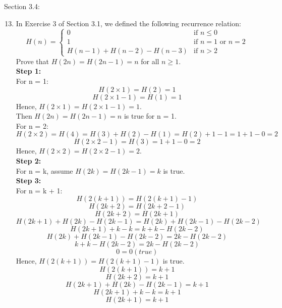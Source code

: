\documentclass[12pt]{article}
\begin{document}
Section 3.4:

\begin{enumerate}
\setcounter{enumi}{12}
    \item In Exercise 3 of Section 3.1, we defined the following recurrence relation:
    \[
    H(n) = 
    \begin{cases} 
    0 & \text{if } n \leq 0 \\
    1 & \text{if } n = 1 \text{ or } n = 2 \\
    H(n-1) + H(n-2) - H(n-3) & \text{if } n > 2
    \end{cases}
    \]
    Prove that $H(2n) = H(2n - 1) = n$ for all $n \geq 1$.\\
    \textbf{Step 1:}\\
    For n = 1:
    \[H(2 \times 1) = H(2) = 1\]
    \[H(2 \times 1 - 1) = H(1) = 1\]
    Hence, $H(2 \times 1) = H(2 \times 1 - 1) = 1$. \\
    Then $H(2n) = H(2n - 1) = n$ is true for n = 1.\\
    For n = 2:
    \[H(2 \times 2) = H(4) = H(3) + H(2) - H(1) = H(2) + 1 - 1 = 1 + 1 - 0 = 2\]
    \[H(2 \times 2 - 1) = H(3) = 1 + 1 - 0 = 2\]
    Hence, $H(2 \times 2) = H(2 \times 2 - 1) = 2$. \\
    \textbf{Step 2:}\\
    For n = k, assume $H(2k) = H(2k - 1) = k$ is true.\\
    \textbf{Step 3:}\\
    For n = k + 1:
    \[H(2(k + 1)) = H(2(k+1) - 1)\]
    \[H(2k + 2) = H(2k+2 - 1)\]
    \[H(2k + 2) = H(2k+1)\]
    \[H(2k + 1) + H(2k) - H(2k-1) = H(2k) + H(2k-1) - H(2k-2)\]
    \[H(2k + 1) + k - k = k + k - H(2k-2)\]
    \[H(2k) + H(2k - 1) - H(2k - 2) = 2k - H(2k-2)\]
    \[k + k - H(2k - 2) = 2k - H(2k-2)\]
    \[0 = 0 (true)\]
    Hence, $H(2(k + 1)) = H(2(k+1) - 1)$ is true.
    \[H(2(k + 1)) = k + 1\]
    \[H(2k+2) = k + 1\]
    \[H(2k+1) + H(2k) - H(2k-1) = k + 1\]
    \[H(2k+1) + k - k = k + 1\]
    \[H(2k+1) = k + 1\]
\end{enumerate}
\end{document}
